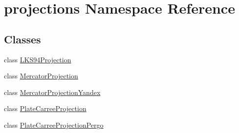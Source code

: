 \hypertarget{namespaceprojections}{\section{projections \-Namespace \-Reference}
\label{namespaceprojections}
}
\subsection*{\-Classes}
\begin{DoxyCompactItemize}
\item 
class \hyperlink{classprojections_1_1_l_k_s94_projection}{\-L\-K\-S94\-Projection}
\item 
class \hyperlink{classprojections_1_1_mercator_projection}{\-Mercator\-Projection}
\item 
class \hyperlink{classprojections_1_1_mercator_projection_yandex}{\-Mercator\-Projection\-Yandex}
\item 
class \hyperlink{classprojections_1_1_plate_carree_projection}{\-Plate\-Carree\-Projection}
\item 
class \hyperlink{classprojections_1_1_plate_carree_projection_pergo}{\-Plate\-Carree\-Projection\-Pergo}
\end{DoxyCompactItemize}
